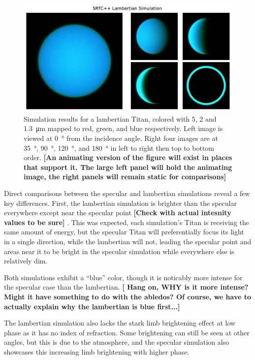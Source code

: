 \documentclass{article}
\begin{document}
\begin{figure}[htb]
\includegraphics[scale = 0.5]{LambertianSim.pdf}
\centering
\caption{Simulation results for a lambertian Titan, colored with 5, 2 and \qty{1.3}{\micro\meter} mapped to red, green, and blue respectively. Left image is viewed at \qty{0}{\degree} from the incidence angle. Right four images are at  \qty{35}{\degree},  \qty{90}{\degree},  \qty{120}{\degree}, and  \qty{180}{\degree} in left to right then top to bottom order. \textbf{\color{red} [An animating version of the figure will exist in places that support it. The large left panel will hold the animating image, the right panels will remain static for comparisons] \color{black}}}
\label{fig:9}
\end{figure}

Direct comparisons between the specular and lambertian simulations reveal a few key differences. First, the lambertian simulation is brighter than the specular everywhere except near the specular point \textbf{\color{red} [Check with actual intesnity values to be sure] \color{black}}. This was expected, each simulation's Titan is receiving the same amount of energy, but the specular Titan will preferentially focus its light in a single direction, while the lambertian will not, leading the specular point and areas near it to be bright in the specular simulation while everywhere else is relatively dim. 

Both simulations exhibit a ``blue'' color, though it is noticably more intense for the specular case than the lambertian. \textbf{\color{red}[ Hang on, WHY is it more intense? Might it have something to do with the abledos? Of course, we have to actually explain why the lambertian is blue first...]\color{black}}

The lambertian simulation also lacks the stark limb brightening effect at low phase as it has no index of refraction. Some brightening can still be seen at other angles, but this is due to the atmosphere, and the specular simulation also showcases this increasing limb brightening with higher phase.
\end{document}
